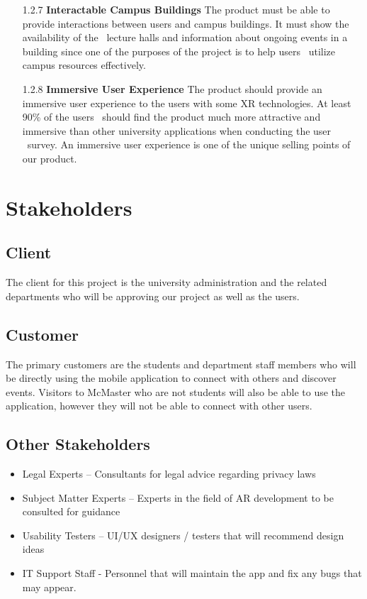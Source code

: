 \documentclass[12pt]{article}
\begin{document}
\begin{itemize}
  \item[1.2.7] \textbf{Interactable Campus Buildings}
  The product must be able to provide interactions between users and campus buildings. It must show the availability of the \
  lecture halls and information about ongoing events in a building since one of the purposes of the project is to help users \
  utilize campus resources effectively.

  \item[1.2.8] \textbf{Immersive User Experience}
  The product should provide an immersive user experience to the users with some XR technologies. At least 90\% of the users \
  should find the product much more attractive and immersive than other university applications when conducting the user \
  survey. An immersive user experience is one of the unique selling points of our product.

\end{itemize}

\section{Stakeholders}
\subsection{Client}

The client for this project is the university administration and the related departments who will be approving our project as well as the users.

\subsection{Customer}

The primary customers are the students and department staff members who will be directly using the mobile application to connect with others and discover events.
Visitors to McMaster who are not students will also be able to use the application, however they will not be able to connect with other users.

\subsection{Other Stakeholders}

\begin{itemize}
\item Legal Experts – Consultants for legal advice regarding privacy laws
\item Subject Matter Experts – Experts in the field of AR development to be consulted for guidance
\item Usability Testers – UI/UX designers / testers that will recommend design ideas
\item IT Support Staff - Personnel that will maintain the app and fix any bugs that may appear.
\end{itemize}
\end{document}
